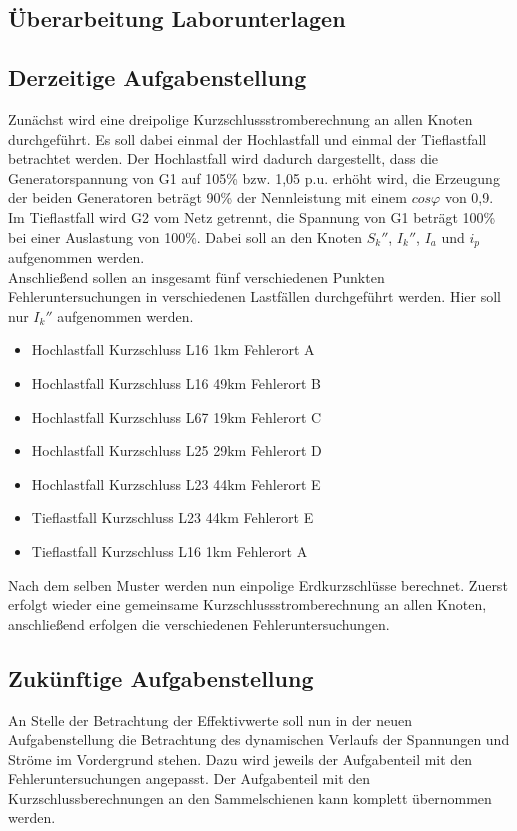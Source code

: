 \documentclass{scrartcl}
\begin{document}
\begin{onehalfspace}
\section{Überarbeitung Laborunterlagen}


\subsection{Derzeitige Aufgabenstellung}
Zunächst wird eine dreipolige Kurzschlussstromberechnung an allen Knoten durchgeführt. Es soll dabei einmal der Hochlastfall und einmal der Tieflastfall betrachtet werden. Der Hochlastfall wird dadurch dargestellt, dass die Generatorspannung von G1 auf 105\% bzw. 1,05 p.u. erhöht wird, die Erzeugung der beiden Generatoren beträgt 90\% der Nennleistung mit einem $cos \varphi $ von 0,9. Im Tieflastfall wird G2 vom Netz getrennt, die Spannung von G1 beträgt 100\% bei einer Auslastung von 100\%. Dabei soll an den Knoten $S_k''$, $I_k''$, $I_a$ und $i_p$ aufgenommen werden. \\
Anschließend sollen an insgesamt fünf verschiedenen Punkten Fehleruntersuchungen in verschiedenen Lastfällen durchgeführt werden. Hier soll nur $I_k''$ aufgenommen werden.

\begin{itemize}
\item Hochlastfall Kurzschluss L16 1km Fehlerort A
\item Hochlastfall Kurzschluss L16 49km Fehlerort B
\item Hochlastfall Kurzschluss L67 19km Fehlerort C
\item Hochlastfall Kurzschluss L25 29km Fehlerort D
\item Hochlastfall Kurzschluss L23 44km Fehlerort E
\item Tieflastfall Kurzschluss L23 44km Fehlerort E
\item Tieflastfall Kurzschluss L16 1km Fehlerort A
\end{itemize}

Nach dem selben Muster werden nun einpolige Erdkurzschlüsse berechnet. Zuerst erfolgt wieder eine gemeinsame Kurzschlussstromberechnung an allen Knoten, anschließend erfolgen die verschiedenen Fehleruntersuchungen.


\subsection{Zukünftige Aufgabenstellung}
An Stelle der Betrachtung der Effektivwerte soll nun in der neuen Aufgabenstellung die Betrachtung des dynamischen Verlaufs der Spannungen und Ströme im Vordergrund stehen. Dazu wird jeweils der Aufgabenteil mit den Fehleruntersuchungen angepasst. Der Aufgabenteil mit den Kurzschlussberechnungen an den Sammelschienen kann komplett übernommen werden.


\end{onehalfspace}
\end{document}
